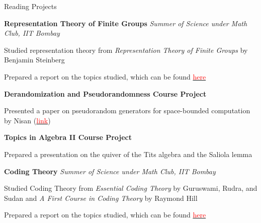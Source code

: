 
\begin{rubric}{Reading Projects}

	\entry*[2022] \textbf{Representation Theory of Finite Groups} \hfill \emph{Summer of Science under Math Club, IIT Bombay}

		Studied representation theory from \emph{Representation Theory of Finite Groups} by Benjamin Steinberg

		Prepared a report on the topics studied, which can be found \href{https://amitrajaraman.github.io/notes/rep-th/main.pdf}{\textcolor{red}{here}}

	\entry*[2022\phantom{}] \textbf{Derandomization and Pseudorandomness Course Project}

		Presented a paper on pseudorandom generators for space-bounded computation by Nisan (\href{https://link.springer.com/article/10.1007/BF01305237}{\textcolor{red}{link}})

	\entry*[2020\phantom{}] \textbf{Topics in Algebra II Course Project}

		Prepared a presentation on the quiver of the Tits algebra and the Saliola lemma

	\entry*[2020] \textbf{Coding Theory} \hfill \emph{Summer of Science under Math Club, IIT Bombay}

		Studied Coding Theory from \textit{Essential Coding Theory} by Guruswami, Rudra, and Sudan and \textit{A First Course in Coding Theory} by Raymond Hill
		

		Prepared a report on the topics studied, which can be found \href{https://amitrajaraman.github.io/notes/coding-th/Coding_Theory.pdf}{\textcolor{red}{here}}





        
\end{rubric}